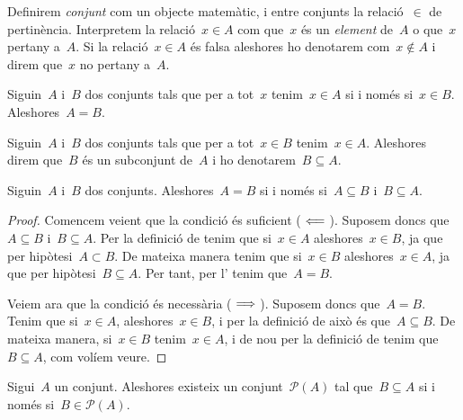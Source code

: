 \documentclass[../../main.tex]{subfiles}
\begin{document}
    Definirem \emph{conjunt} com un objecte matemàtic, i entre conjunts la relació~\(\in\) de pertinència.
    Interpretem la relació~\(x\in A\) com que~\(x\) és un \emph{element} de~\(A\) o que~\(x\) pertany a~\(A\).
    Si la relació~\(x\in A\) és falsa aleshores ho denotarem com~\(x\notin A\) i direm que~\(x\) no pertany a~\(A\).
    \begin{axiom}
        \label{axiom:axioma-dextensionalitat}
        Siguin~\(A\) i~\(B\) dos conjunts tals que per a tot~\(x\) tenim~\(x\in A\) si i només si~\(x\in B\).
        Aleshores~\(A=B\).
    \end{axiom}
    \begin{definition}[Subconjunt]
        \label{def:subconjunt}
        Siguin~\(A\) i~\(B\) dos conjunts tals que per a tot~\(x\in B\) tenim~\(x\in A\).
        Aleshores direm que~\(B\) és un subconjunt de~\(A\) i ho denotarem~\(B\subseteq A\).
    \end{definition}
    \begin{theorem}
        \label{thm:doble-inclusio}
        Siguin~\(A\) i~\(B\) dos conjunts.
        Aleshores~\(A=B\) si i només si~\(A\subseteq B\) i~\(B\subseteq A\).
    \end{theorem}
    \begin{proof}
        Comencem veient que la condició és suficient (\(\impliedby\)).
        Suposem doncs que~\(A\subseteq B\) i~\(B\subseteq A\).
        Per la definició de  tenim que si~\(x\in A\) aleshores~\(x\in B\), ja que per hipòtesi~\(A\subset B\).
        De mateixa manera tenim que si~\(x\in B\) aleshores~\(x\in A\), ja que per hipòtesi~\(B\subseteq A\).
        Per tant, per l' tenim que~\(A=B\).

        Veiem ara que la condició és necessària (\(\implies\)).
        Suposem doncs que~\(A=B\).
        Tenim que si~\(x\in A\), aleshores~\(x\in B\), i per la definició de  això és que~\(A\subseteq B\).
        De mateixa manera, si~\(x\in B\) tenim~\(x\in A\), i de nou per la definició de  tenim que~\(B\subseteq A\), com volíem veure.
    \end{proof}
    \begin{axiom}
        \label{axiom:conjunt-potencia}
        Sigui~\(A\) un conjunt.
        Aleshores existeix un conjunt~\(\mathcal{P}(A)\) tal que~\(B\subseteq A\) si i només si~\(B\in\mathcal{P}(A)\).
    \end{axiom}
\end{document}
